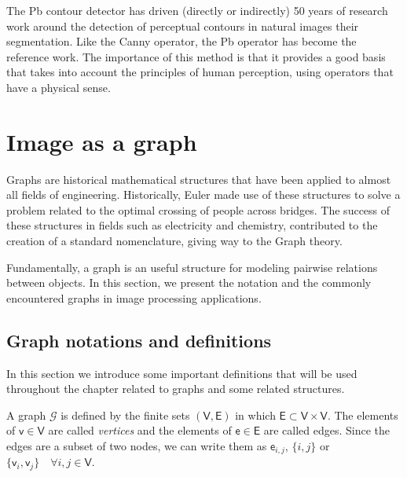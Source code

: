 The Pb contour detector has driven (directly or indirectly) 50 years of research work around the detection of perceptual contours in natural images their segmentation. Like the Canny operator, the Pb operator has become the reference work. The importance of this method is that it provides a good basis that takes into account the principles of human perception, using operators that have a physical sense.


\section{Image as a graph}

Graphs are historical mathematical structures that have been applied to almost all fields of engineering. Historically, Euler made use of these structures to solve a problem related to the optimal crossing of people across bridges. The success of these structures in fields such as electricity and chemistry, contributed to the creation of a standard nomenclature, giving way to the Graph theory.

Fundamentally, a graph is an useful structure for modeling pairwise relations between objects. In this section, we present the notation and the commonly encountered graphs in image processing applications.





\subsection{Graph notations and definitions}

In this section we introduce some important definitions that will be used throughout the chapter related to graphs and some related structures.

\theoremstyle{definition}
\begin{definition}[Graph]
	A graph $\mathcal{G}$ is defined by the finite sets $(\mathsf{V}, \mathsf{E})$ in which $\mathsf{E} \subset \mathsf{V} \times \mathsf{V}$. The elements of $\mathsf{v} \in \mathsf{V}$ are called \textit{vertices} and the elements of $\mathsf{e} \in \mathsf{E}$ are called edges. Since the edges are a subset of two nodes, we can write them as $\mathsf{e}_{i,j}$, $\{i, j\}$ or $\{\mathsf{v}_{i}, \mathsf{v}_{j}\} \quad \forall i, j \in \mathsf{V}$.
\end{definition}

